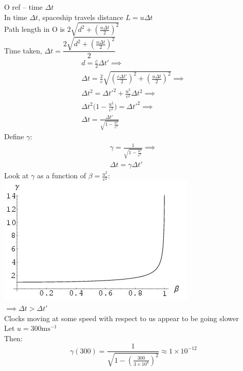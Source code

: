 \documentclass[a4paper, 11pt, fleqn, normalem]{report}
\begin{document}
O ref -- time $\Delta t$ \\
In time $\Delta t$, spaceship travels distance $L = u\Delta t$ \\
Path length in O is $2\sqrt{d^{2} + (\frac{u\Delta t}{2})^{2}}$ \\
Time taken, $\Delta t = \dfrac{2\sqrt{d^{2} + (\frac{u\Delta t}{2})^{2}}}{2}$
\begin{gather*}
    d = \frac{c}{2}\Delta t' \implies \\
    \Delta t = \frac{2}{c}\sqrt{(\frac{c\Delta t'}{2})^{2} + (\frac{u\Delta t}{2})^{2}} \implies \\
    \Delta t^{2} = \Delta t'^{2} + \frac{u^{2}}{c^{2}}\Delta t^{2} \implies \\
    \Delta t^{2}\Big(1 - \frac{u^{2}}{c^{2}}\Big) = \Delta t'^{2} \implies \\
    \Delta t = \frac{\Delta t'}{\sqrt{1 - \tfrac{u^{2}}{c^{2}}}}
\end{gather*}
Define $\gamma$:
\begin{gather*}
    \gamma = \frac{1}{\sqrt{1 - \tfrac{u^{2}}{c^{2}}}} \implies \\
    \Delta t = \gamma\Delta t'
\end{gather*}
Look at $\gamma$ as a function of $\beta = \frac{u^{2}}{c^{2}}$: \\
\includegraphics{Gammafn.jpg} \\
$\implies \Delta t > \Delta t'$ \\
Clocks moving at some speed with respect to us appear to be going slower \\
Let $u = 300\text{ms}^{-1}$ \\
Then:
\begin{equation*}
    \gamma(300) = \frac{1}{\sqrt{1 - (\tfrac{300}{3\times10^{8}})^{2}}} \approx 1\times10^{-12}
\end{equation*}
\end{document}
